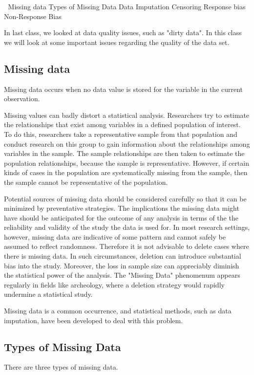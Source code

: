 

Missing data
Types of Missing Data
Data Imputation
Censoring
Response bias
Non-Response Bias

In last class, we looked at data quality issues, such as "dirty data". In this class we will look at some important issues regarding the quality of the data set.
\subsection{Missing data}
Missing data occurs when no data value is stored for the variable in the current observation. 

Missing values can badly distort a statistical analysis. Researchers try to estimate the relationships that exist among variables in a defined population of interest. To do this, researchers take a representative sample from that population and conduct research on this group to gain information about the relationships among variables in the sample. 
The sample relationships are then taken to estimate the population relationships, because the sample is representative. However, if certain kinds of cases in the population are systematically missing from the sample, then the sample cannot be representative of the population.

Potential sources of missing data should be considered carefully so that it can be minimized by preventative strategies. 
The implications the missing data might have should be anticipated for the outcome of any analysis in terms of the the reliability and validity of the study the data is used for.
In most research settings, however, missing data are indicative of some pattern and cannot safely be assumed to reflect randomness. Therefore it is not advisable to delete cases where there is missing data. 
In such circumstances, deletion can introduce substantial bias into the study. Moreover, the loss in sample size can appreciably diminish the statistical power of the analysis. The "Missing Data" phenomenum appears regularly in fields like archeology, where a deletion strategy would rapidly undermine a statistical study. 

Missing data is a common occurrence, and statistical methods, such as data imputation, have been developed to deal with this problem. 

\subsection{Types of Missing Data}
There are three types of missing data.

